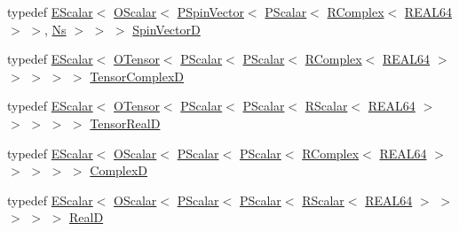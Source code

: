 \begin{DoxyCompactItemize}
\item 
typedef \mbox{\hyperlink{classENSEM_1_1EScalar}{E\+Scalar}}$<$ \mbox{\hyperlink{classENSEM_1_1OScalar}{O\+Scalar}}$<$ \mbox{\hyperlink{classENSEM_1_1PSpinVector}{P\+Spin\+Vector}}$<$ \mbox{\hyperlink{classENSEM_1_1PScalar}{P\+Scalar}}$<$ \mbox{\hyperlink{classENSEM_1_1RComplex}{R\+Complex}}$<$ \mbox{\hyperlink{namespaceENSEM_a85b215b9f1f43715aebee01718e25082}{R\+E\+A\+L64}} $>$ $>$, \mbox{\hyperlink{namespaceENSEM_a6f05e048f9b2eb1a19131074f8abc25f}{Ns}} $>$ $>$ $>$ \mbox{\hyperlink{group__defs_ga9fdac1b0bfb17e095eb78a356858681b}{Spin\+VectorD}}
\item 
typedef \mbox{\hyperlink{classENSEM_1_1EScalar}{E\+Scalar}}$<$ \mbox{\hyperlink{classENSEM_1_1OTensor}{O\+Tensor}}$<$ \mbox{\hyperlink{classENSEM_1_1PScalar}{P\+Scalar}}$<$ \mbox{\hyperlink{classENSEM_1_1PScalar}{P\+Scalar}}$<$ \mbox{\hyperlink{classENSEM_1_1RComplex}{R\+Complex}}$<$ \mbox{\hyperlink{namespaceENSEM_a85b215b9f1f43715aebee01718e25082}{R\+E\+A\+L64}} $>$ $>$ $>$ $>$ $>$ \mbox{\hyperlink{group__defs_ga36b77f1fc618cfdb020d0b95710f1f87}{Tensor\+ComplexD}}
\item 
typedef \mbox{\hyperlink{classENSEM_1_1EScalar}{E\+Scalar}}$<$ \mbox{\hyperlink{classENSEM_1_1OTensor}{O\+Tensor}}$<$ \mbox{\hyperlink{classENSEM_1_1PScalar}{P\+Scalar}}$<$ \mbox{\hyperlink{classENSEM_1_1PScalar}{P\+Scalar}}$<$ \mbox{\hyperlink{classENSEM_1_1RScalar}{R\+Scalar}}$<$ \mbox{\hyperlink{namespaceENSEM_a85b215b9f1f43715aebee01718e25082}{R\+E\+A\+L64}} $>$ $>$ $>$ $>$ $>$ \mbox{\hyperlink{group__defs_gacf3d977d3ad24e35a7d782ef367c6c5c}{Tensor\+RealD}}
\item 
typedef \mbox{\hyperlink{classENSEM_1_1EScalar}{E\+Scalar}}$<$ \mbox{\hyperlink{classENSEM_1_1OScalar}{O\+Scalar}}$<$ \mbox{\hyperlink{classENSEM_1_1PScalar}{P\+Scalar}}$<$ \mbox{\hyperlink{classENSEM_1_1PScalar}{P\+Scalar}}$<$ \mbox{\hyperlink{classENSEM_1_1RComplex}{R\+Complex}}$<$ \mbox{\hyperlink{namespaceENSEM_a85b215b9f1f43715aebee01718e25082}{R\+E\+A\+L64}} $>$ $>$ $>$ $>$ $>$ \mbox{\hyperlink{group__defs_gaf38ee8c84f090ee0c3b76e7a384fb316}{ComplexD}}
\item 
typedef \mbox{\hyperlink{classENSEM_1_1EScalar}{E\+Scalar}}$<$ \mbox{\hyperlink{classENSEM_1_1OScalar}{O\+Scalar}}$<$ \mbox{\hyperlink{classENSEM_1_1PScalar}{P\+Scalar}}$<$ \mbox{\hyperlink{classENSEM_1_1PScalar}{P\+Scalar}}$<$ \mbox{\hyperlink{classENSEM_1_1RScalar}{R\+Scalar}}$<$ \mbox{\hyperlink{namespaceENSEM_a85b215b9f1f43715aebee01718e25082}{R\+E\+A\+L64}} $>$ $>$ $>$ $>$ $>$ \mbox{\hyperlink{group__defs_ga6436522708cc37b1cb43676ea3b4b2fd}{RealD}}

\end{DoxyCompactItemize}
